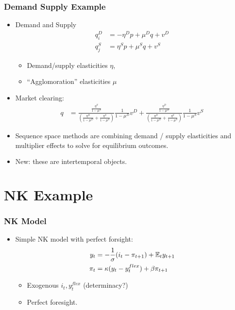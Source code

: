 \documentclass[english,xcolor=svgnames]{beamer}
\begin{document}
\begin{frame}
    \frametitle{Demand Supply Example}
    \begin{itemize}
        \item Demand and Supply
        \begin{align*}
            q_i^D &= - \eta^D p + \mu^D q + v^D  \\
            q_j^S &= \eta^S p + \mu^S q + v^S 
        \end{align*}
        \begin{itemize}
            \item Demand/supply elasticities $\eta$, 
            \item ``Agglomoration'' elasticities $\mu$
        \end{itemize}
        \item Market clearing:
        \begin{align*}
            q &= \frac{\frac{\eta^S}{1-\mu^S}}{( \frac{\eta^D}{1-\mu^D} + \frac{\eta^S}{1-\mu^S})}\frac{1}{1-\mu^D}v^D  + \frac{\frac{\eta^D}{1-\mu^D} }{( \frac{\eta^D}{1-\mu^D} + \frac{\eta^S}{1-\mu^S})} \frac{1}{1-\mu^S}v^S
        \end{align*}
        \item Sequence space methods are combining demand / supply elasticities and multiplier effects to solve for equilibrium outcomes.
        \item New: these are intertemporal objects.
    \end{itemize}
\end{frame}

\section{NK Example}

\begin{frame}
    \frametitle{NK Model}
    \begin{itemize}
        \item Simple NK model with perfect forsight:
        \begin{align*}
            y_t &= -\frac{1}{\sigma}(i_t - \pi_{t+1}) + \mathbb{E}_t y_{t+1}  \\
            \pi_t &= \kappa (y_t - y_t^{flex}) + \beta\pi_{t+1}
        \end{align*}
        \begin{itemize}
            \item Exogenous $i_t, y_t^{flex}$ (determinacy?) 
            \item Perfect foresight.
        \end{itemize}
\end{itemize}
\end{frame}
\end{document}
